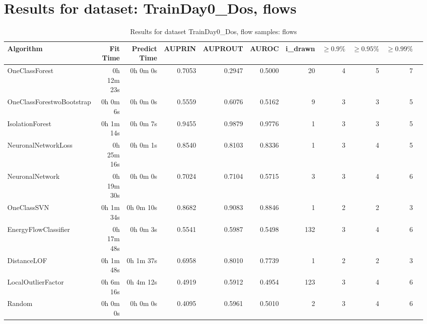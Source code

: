 \documentclass{article}
\begin{document}
\section*{Results for dataset: TrainDay0_Dos, flows}
\begin{table}[h!]
\centering
\caption{Results for dataset TrainDay0_Dos, flow samples: flows}
\begin{tabular}{lrrrrrrrrrr}
\toprule
Algorithm & Fit Time & Predict Time & AUPRIN & AUPROUT & AUROC & i\_drawn & $\geq 0.9\%$ & $\geq 0.95\%$ & $\geq 0.99\%$ \\
\midrule
OneClassForest & 0h 12m 23s & 0h 0m 0s & 0.7053 & 0.2947 & 0.5000 & 20 & 4 & 5 & 7 \\
OneClassForestwoBootstrap & 0h 0m 6s & 0h 0m 0s & 0.5559 & 0.6076 & 0.5162 & 9 & 3 & 3 & 5 \\
IsolationForest & 0h 1m 14s & 0h 0m 7s & 0.9455 & 0.9879 & 0.9776 & 1 & 3 & 3 & 5 \\
NeuronalNetworkLoss & 0h 25m 16s & 0h 0m 1s & 0.8540 & 0.8103 & 0.8336 & 1 & 3 & 4 & 5 \\
NeuronalNetwork & 0h 19m 30s & 0h 0m 0s & 0.7024 & 0.7104 & 0.5715 & 3 & 3 & 4 & 6 \\
OneClassSVN & 0h 1m 34s & 0h 0m 10s & 0.8682 & 0.9083 & 0.8846 & 1 & 2 & 2 & 3 \\
EnergyFlowClassifier & 0h 17m 48s & 0h 0m 3s & 0.5541 & 0.5987 & 0.5498 & 132 & 3 & 4 & 6 \\
DistanceLOF & 0h 1m 48s & 0h 1m 37s & 0.6958 & 0.8010 & 0.7739 & 1 & 2 & 2 & 3 \\
LocalOutlierFactor & 0h 6m 16s & 0h 4m 12s & 0.4919 & 0.5912 & 0.4954 & 123 & 3 & 4 & 6 \\
Random & 0h 0m 0s & 0h 0m 0s & 0.4095 & 0.5961 & 0.5010 & 2 & 3 & 4 & 6 \\
\bottomrule
\end{tabular}
\end{table}
\end{document}
